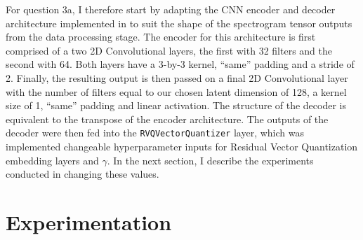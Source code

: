 \documentclass[11pt,a4paper]{article}
\begin{document}
For question 3a, I therefore start
by adapting the CNN encoder and decoder architecture implemented in \cite{vqvae_keras} to suit
the shape of the spectrogram tensor outputs from the data processing stage. The
encoder for this architecture is first comprised of a two 2D Convolutional layers, the
first with 32 filters and the second with 64. Both layers have a 3-by-3 kernel, ``same''
padding and a stride of 2. Finally, the resulting output is then passed on a
final 2D Convolutional layer with the number of filters equal to our chosen latent dimension
of 128, a kernel size of 1, ``same'' padding and linear activation. The structure of the decoder
is equivalent to the transpose of the encoder architecture. The outputs
of the decoder were then fed into the \verb|RVQVectorQuantizer| layer, which
was implemented changeable hyperparameter inputs for Residual Vector Quantization embedding layers
and $\gamma$. In the next section, I describe the experiments conducted in changing these values.

 

\section{Experimentation}
\end{document}
